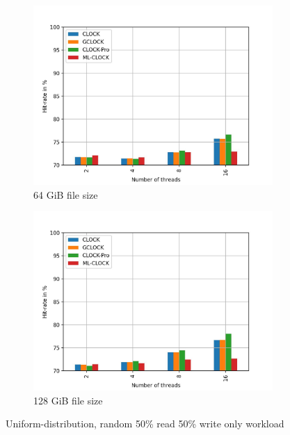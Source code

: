 \documentclass[
	12pt,
	a4paper,
	abstract,
	bibliography=totoc,
	chapterprefix,
	headings=openright,
	numbers=endperiod,
	parskip=half,
	twoside,
]{scrreprt}
\begin{document}
\begin{figure}[H]
\begin{subfigure}{0.4\textwidth}
		\includegraphics[width=\textwidth]{multi_64_gb_rw_50to50_uniform.jpg}		
		\caption{64 GiB file size}
		\label{fig:rw_50to50 64 uniform}
	\end{subfigure}
	\hfill
	\begin{subfigure}{0.4\textwidth}
		\includegraphics[width=\textwidth]{multi_128_gb_rw_50to50_uniform.jpg}		
		\caption{128 GiB file size}
		\label{fig:rw_50to50 128 uniform}
	\end{subfigure}
	\caption{Uniform-distribution, random 50\% read 50\% write only workload}
	\label{fig:multi uniform rw_50to50}
\end{figure}
\end{document}

